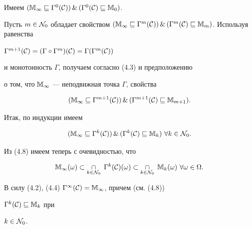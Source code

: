 \begin{pf}


Имеем $({{\Bbb M}_\infty}


\sqsubseteq {{\Gamma}^0}({\cal C}))\, \&\,


({{\Gamma}^0}({\cal C}) \sqsubseteq {{\Bbb M}_0})$.


Пусть $m \in {{\cal N}_0}$ обладает свойством $({{\Bbb M}_\infty}


\sqsubseteq {{\Gamma}^m}({\cal C}))\, \&\, ({{\Gamma}^m}({\cal C})


\sqsubseteq {{\Bbb M}_m})$. Используя равенства


${{\Gamma}^{m+1}}({\cal C}) = ({\Gamma} \circ {{\Gamma}^m})({\cal C}) =


{\Gamma}({{\Gamma}^m}({\cal C}))$


и монотонность $\Gamma$, получаем согласно (4.3) и предположению


о том, что ${\Bbb M}_\infty$ --- неподвижная точка $\Gamma$, свойства


$$


({{\Bbb M}_\infty} \sqsubseteq {{\Gamma}^{m+1}}({\cal C}))\, \&\,


({{\Gamma}^{m+1}}({\cal C}) \sqsubseteq {{\Bbb M}_{m+1}}).


$$


Итак, по индукции имеем 


\begin{equation}


({{\Bbb M}_\infty} \sqsubseteq {{\Gamma}^k}({\cal C}))\, \&\,


({{\Gamma}^k}({\cal C}) \sqsubseteq {{\Bbb M}_k})


\ \forall{k} \in {{\cal N}_0}.


\end{equation}


Из (4.8) имеем теперь с очевидностью, что 


$$


{{\Bbb M}_\infty}(\omega)\subset\mathop{\cap}\limits_{k \in {{\cal N}_0}}\;


{{\Gamma}^k}({\cal C})(\omega) \subset


\mathop{\cap}\limits_{k \in {{\cal N}_0}}\;


{{\Bbb M}_k}(\omega)\ \forall{\omega} \in \Omega.


$$


В силу (4.2), (4.4) ${{\Gamma}^\infty}({\cal C}) =


{{\Bbb M}_\infty}$, причем (см. (4.8))


${{{\Gamma}^k}({\cal C})} \sqsubseteq {{\Bbb M}_k}$ при


$k \in {{\cal N}_0}$.


\end{pf}





